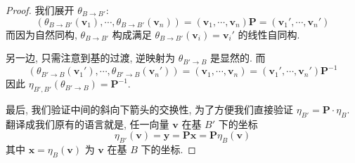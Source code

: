 \documentclass[UTF8]{book}
\begin{document}
\begin{proof}
    我们展开 $\theta_{B \to B'}$: 
    $$ 
    (\theta_{B \to B'}(\boldsymbol{v}_1),\cdots,
    \theta_{B \to B'}(\boldsymbol{v}_n)) = 
    (\boldsymbol{v}_1,\cdots,\boldsymbol{v}_n)\boldsymbol{P}
    = (\boldsymbol{v}_1',\cdots,\boldsymbol{v}_n')
    $$
    而因为自然同构, $\theta_{B \to B'}$ 构成满足 
    $\theta_{B \to B'}(\boldsymbol{v}_i) = \boldsymbol{v}_i'$ 
    的线性自同构. 

    另一边, 只需注意到基的过渡, 逆映射为 $\theta_{B' \to B}$ 是显然的. 
    而 
    $$ 
    (\theta_{B' \to B}(\boldsymbol{v}_1'),\cdots,
    \theta_{B' \to B}(\boldsymbol{v}_n')) = 
    (\boldsymbol{v}_1,\cdots,\boldsymbol{v}_n) =
    (\boldsymbol{v}_1',\cdots,\boldsymbol{v}_n')\boldsymbol{P}^{-1}
    $$
    因此 $\eta_{B',B'}(\theta_{B' \to B})=\boldsymbol{P}^{-1}$.

    最后, 我们验证中间的斜向下箭头的交换性, 为了方便我们直接验证 
    $ \eta_{B'} = \boldsymbol{P}\cdot \eta_{B} $. 
    翻译成我们原有的语言就是, 任一向量 $\boldsymbol{v}$ 在基 $B'$ 
    下的坐标 
    $$\eta_{B'}(\boldsymbol{v})=\boldsymbol{y}= 
    \boldsymbol{Px}=\boldsymbol{P}\eta_{B}(\boldsymbol{v})$$
    其中 $\boldsymbol{x}=\eta_{B}(\boldsymbol{v})$ 为 $\boldsymbol{v}$ 
    在基 $B$ 下的坐标. 
\end{proof}
\end{document}
